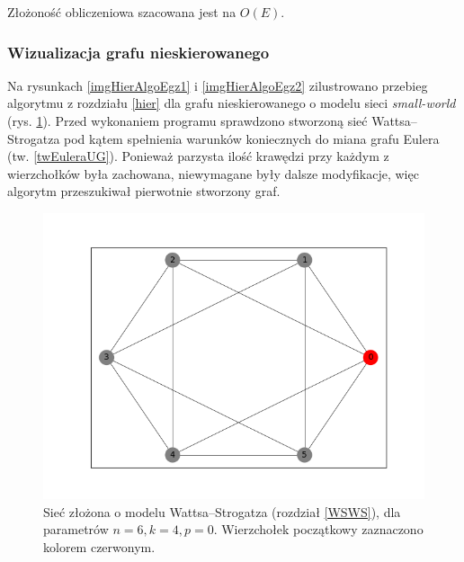 \documentclass[a4paper, 12pt, twoside, openright]{article}
\begin{document}
	Złożoność obliczeniowa szacowana jest na $O(E)$. \label{zl_H}
	
\subsubsection{Wizualizacja grafu nieskierowanego}
\indent\par
	Na rysunkach \ref{imgHierAlgoEgz1} i \ref{imgHierAlgoEgz2} zilustrowano przebieg algorytmu z rozdziału \ref{hier} dla grafu nieskierowanego o modelu sieci \textit{small-world} (rys. \ref{h_graph}). Przed wykonaniem programu sprawdzono stworzoną sieć Wattsa–Strogatza pod kątem spełnienia warunków koniecznych do miana grafu Eulera (tw. \ref{twEuleraUG}). Ponieważ parzysta ilość krawędzi przy każdym z wierzchołków była zachowana, niewymagane były dalsze modyfikacje, więc algorytm przeszukiwał pierwotnie stworzony graf.
	
	\begin{figure}[!htb]
		\centering
		\includegraphics[width=1\textwidth]{img/heiAlgo/hei_algo0.png}
		\caption[]{Sieć złożona o modelu  Wattsa–Strogatza (rozdział \ref{WSWS}), dla parametrów $n=6, k=4, p=0$. Wierzchołek początkowy zaznaczono kolorem czerwonym.}
		\label{h_graph}
	\end{figure}	
\end{document}
